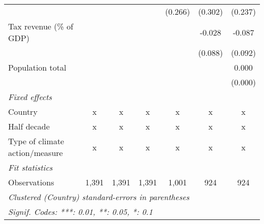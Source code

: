 \begin{tabular}{lcccccc}
                                                              &         &              &                & (0.266)       & (0.302)       & (0.237)\\   
   Tax revenue (\% of GDP)                                    &         &              &                &               & -0.028        & -0.087\\   
                                                              &         &              &                &               & (0.088)       & (0.092)\\   
   Population total                                           &         &              &                &               &               & 0.000\\   
                                                              &         &              &                &               &               & (0.000)\\   
   \emph{Fixed effects}\\
   Country                                                    & x       & x            & x              & x             & x             & x\\  
   Half decade                                                & x       & x            & x              & x             & x             & x\\  
   Type of climate action/measure                             & x       & x            & x              & x             & x             & x\\  
   \midrule \emph{Fit statistics}\\
   Observations                                               & 1,391   & 1,391        & 1,391          & 1,001         & 924           & 924\\  
   \midrule
   \multicolumn{7}{l}{\emph{Clustered (Country) standard-errors in parentheses}}\\
   \multicolumn{7}{l}{\emph{Signif. Codes: ***: 0.01, **: 0.05, *: 0.1}}\\
\end{tabular}
\par\endgroup


